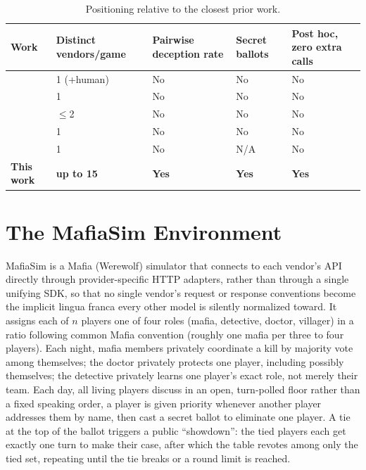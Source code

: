 \documentclass{article}
\begin{document}
\begin{table}[t]
\centering
\caption{Positioning relative to the closest prior work.}
\label{tab:positioning}
\small
\begin{tabular}{@{}p{2.6cm}p{1.6cm}p{1.6cm}p{1.6cm}p{1.9cm}@{}}
\toprule
Work & Distinct vendors/game & Pairwise deception rate & Secret ballots & Post hoc, zero extra calls \\
\midrule
\citet{eckhaus2025time}  & 1 (+human) & No & No & No \\
\citet{zhang2025dvm}     & 1          & No & No & No \\
\citet{song2025beyond}   & $\leq$2    & No & No & No \\
\citet{mittal2026triadic} & 1         & No & No & No \\
\citet{bakhtin2022human} & 1          & No & N/A & No \\
\textbf{This work}       & \textbf{up to 15} & \textbf{Yes} & \textbf{Yes} & \textbf{Yes} \\
\bottomrule
\end{tabular}
\end{table}

\section{The MafiaSim Environment}
\label{sec:environment}

MafiaSim is a Mafia (Werewolf) simulator that connects to each vendor's API directly through provider-specific HTTP adapters, rather than through a single unifying SDK, so that no single vendor's request or response conventions become the implicit lingua franca every other model is silently normalized toward. It assigns each of $n$ players one of four roles (mafia, detective, doctor, villager) in a ratio following common Mafia convention (roughly one mafia per three to four players). Each night, mafia members privately coordinate a kill by majority vote among themselves; the doctor privately protects one player, including possibly themselves; the detective privately learns one player's exact role, not merely their team. Each day, all living players discuss in an open, turn-polled floor rather than a fixed speaking order, a player is given priority whenever another player addresses them by name, then cast a secret ballot to eliminate one player. A tie at the top of the ballot triggers a public ``showdown'': the tied players each get exactly one turn to make their case, after which the table revotes among only the tied set, repeating until the tie breaks or a round limit is reached.
\end{document}
